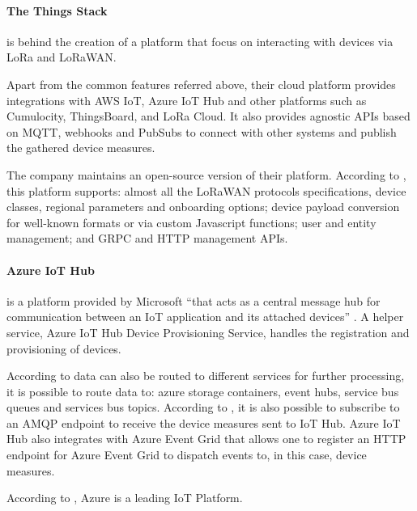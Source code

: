 \paragraph{The Things Stack}
\label{par:stateofart:arch:infra:middleware:ttn}

 is behind the creation of a platform that focus on interacting with devices via LoRa and LoRaWAN.

Apart from the common features referred above, their cloud platform provides integrations with AWS IoT, Azure IoT Hub and other platforms such as Cumulocity, ThingsBoard, and LoRa Cloud. It also provides agnostic \gls{API}s based on \gls{MQTT}, webhooks and PubSubs to connect with other systems and publish the gathered device measures.

The company maintains an open-source version of their platform. According to , this platform supports: almost all the LoRaWAN protocols specifications, device classes, regional parameters and onboarding options; device payload conversion for well-known formats or via custom Javascript functions; user and entity management; and GRPC and HTTP management \gls{API}s. 

\paragraph{Azure IoT Hub}
\label{par:stateofart:arch:infra:middleware:azure}

 is a platform provided by Microsoft ``that acts as a central message hub for communication between an IoT application and its attached devices'' \parencite{azure-hub}. A helper service, Azure IoT Hub Device Provisioning Service, handles the registration and provisioning of devices.

According to \cite{azure-hub} data can also be routed to different services for further processing, it is possible to route data to: azure storage containers, event hubs, service bus queues and services bus topics. According to \cite{azure-hub-amqp}, it is also possible to subscribe to an \gls{AMQP} endpoint to receive the device measures sent to \gls{IoT} Hub. Azure IoT Hub also integrates with Azure Event Grid that allows one to register an HTTP endpoint for Azure Event Grid to dispatch events to, in this case, device measures.

According to , Azure is a leading \gls{IoT} Platform.


